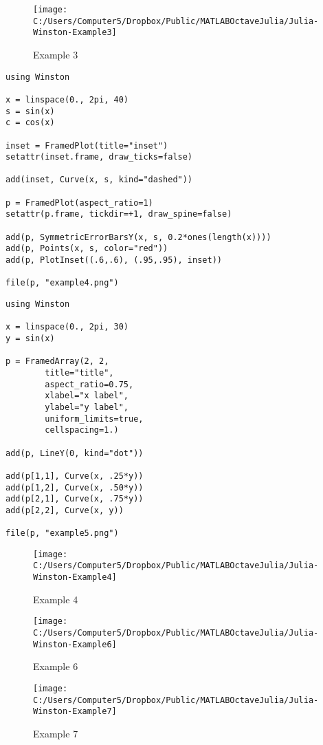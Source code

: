 \documentclass[12pt]{article}
\begin{document}
\newpage
\begin{figure}[h!]
\centering
\texttt{[image: C:/Users/Computer5/Dropbox/Public/MATLABOctaveJulia/Julia-Winston-Example3]}
\caption{Example 3}
\label{fig:Julia-Winston-Example3}
\end{figure}
\newpage

\begin{framed}
\begin{verbatim}
using Winston

x = linspace(0., 2pi, 40)
s = sin(x)
c = cos(x)

inset = FramedPlot(title="inset")
setattr(inset.frame, draw_ticks=false)

add(inset, Curve(x, s, kind="dashed"))

p = FramedPlot(aspect_ratio=1)
setattr(p.frame, tickdir=+1, draw_spine=false)

add(p, SymmetricErrorBarsY(x, s, 0.2*ones(length(x))))
add(p, Points(x, s, color="red"))
add(p, PlotInset((.6,.6), (.95,.95), inset))

file(p, "example4.png")
\end{verbatim}
\end{framed}

\begin{framed}
\begin{verbatim}
using Winston

x = linspace(0., 2pi, 30)
y = sin(x)

p = FramedArray(2, 2,
        title="title",
        aspect_ratio=0.75,
        xlabel="x label",
        ylabel="y label",
        uniform_limits=true,
        cellspacing=1.)

add(p, LineY(0, kind="dot"))

add(p[1,1], Curve(x, .25*y))
add(p[1,2], Curve(x, .50*y))
add(p[2,1], Curve(x, .75*y))
add(p[2,2], Curve(x, y))

file(p, "example5.png")

\end{verbatim}
\end{framed}
\newpage
\begin{figure}[h!]
\centering
\texttt{[image: C:/Users/Computer5/Dropbox/Public/MATLABOctaveJulia/Julia-Winston-Example4]}
\caption{Example 4}
\label{fig:Julia-Winston-Example4}
\end{figure}

\newpage
\begin{figure}[h!]
\centering
\texttt{[image: C:/Users/Computer5/Dropbox/Public/MATLABOctaveJulia/Julia-Winston-Example6]}
\caption{Example 6}
\label{fig:Julia-Winston-Example6}
\end{figure}

\begin{figure}[h!]
\centering
\texttt{[image: C:/Users/Computer5/Dropbox/Public/MATLABOctaveJulia/Julia-Winston-Example7]}
\caption{Example 7}
\label{fig:Julia-Winston-Example7}
\end{figure}
\end{document}
